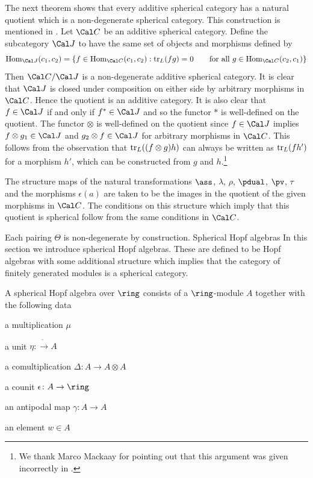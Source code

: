 The next theorem shows that every additive spherical category has a
natural quotient which is a non-degenerate spherical category.
This construction is mentioned in \cite{Turaev  1992}.
 Let ${\Cal C}$ be an additive 
spherical category. Define the subcategory ${\Cal J}$ to have the same set of 
objects and morphisms defined by
$$\Hom_{\Cal J}(c_1,c_2)=\{f\in \Hom_{\Cal C}(c_1,c_2): \tr_L (fg)=0\qquad
\text{for all $g\in \Hom_{\Cal C}(c_2,c_1)$}\}$$
Then ${\Cal C}/{\Cal J}$ is a non-degenerate additive spherical category.
\endproclaim
{} It is clear that ${\Cal J}$ is closed under composition on either
side by arbitrary morphisms in ${\Cal C}$. Hence the quotient is an
additive category. It is also clear that $f\in {\Cal J}$ if and only if $f^*\in {\Cal J}$
and so the functor $*$ is well-defined on the quotient. The functor
$\otimes$ is well-defined on the quotient since $f\in {\Cal J}$ implies 
$f\otimes g_1\in {\Cal J}$ and $g_2\otimes f\in {\Cal J}$ for arbitrary morphisms in
${\Cal C}$. This follows from the observation that $\operatorname{tr}_L((f\otimes g)h)$ can always be written as $\operatorname{tr}_L(f h')$ for a morphism $h'$, which can be constructed from $g$ and $h$.\footnote{We thank Marco Mackaay for pointing out that this argument was given incorrectly in \cite{Barrett and Westbury 1996}.}

The structure maps of the natural transformations $\ass$, $\lambda$, $\rho$,
$\pdual$, $\pv$, $\tau$ and the morphisms $\epsilon (a)$ are taken to be
the images in the quotient of the given morphisms in ${\Cal C}$. The
conditions on this structure which imply that this quotient is spherical
follow from the same conditions in ${\Cal C}$.

Each pairing $\Theta$ is non-degenerate by construction.
\enddemo
\head\headno  Spherical Hopf algebras \endhead
In this section we introduce spherical Hopf algebras. These are defined
to be Hopf algebras with some additional structure which implies that the
category of finitely generated modules is a spherical category.

 A spherical Hopf algebra
over $\ring$ consists of a $\ring$-module $A$
together with the following data \roster
\item a multiplication $\mu$
\item a unit $\eta\colon \ring\to A$
\item a comultiplication $\Delta\colon A\to A\otimes A$
\item a counit $\epsilon\colon A\to \ring$
\item an antipodal map $\gamma\colon A\to A$
\item an element $w\in A$
\endroster\enddefinition

